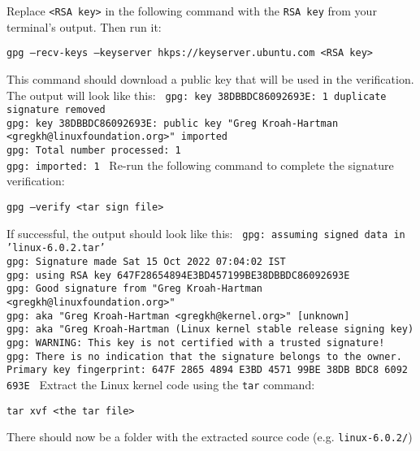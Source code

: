 \documentclass[12pt,a4paper]{report}
\begin{document}
\newline
\newline
Replace \texttt{<RSA key>} in the following command with the \texttt{RSA key} from your terminal's output. Then run it:
\newline
\newline
\centerline{\texttt{\small gpg --recv-keys --keyserver hkps://keyserver.ubuntu.com <RSA key>}}
\newline
\newline
This command should download a public key that will be used in the verification. The output will look like this:
\newline
\newline
\texttt{\scriptsize
gpg: key 38DBBDC86092693E: 1 duplicate signature removed
\\
gpg: key 38DBBDC86092693E: public key "Greg Kroah-Hartman <gregkh@linuxfoundation.org>" imported
\\
gpg: Total number processed: 1
\\
gpg:               imported: 1
}
\newline
\newline
Re-run the following command to complete the signature verification:
\newline
\newline
\centerline{\texttt{gpg --verify <tar sign file>}}
\newline
\newline
If successful, the output should look like this:
\newline
\newline
\texttt{\footnotesize
gpg: assuming signed data in 'linux-6.0.2.tar'
\\
gpg: Signature made Sat 15 Oct 2022 07:04:02 IST
\\
gpg:                using RSA key 647F28654894E3BD457199BE38DBBDC86092693E
\\
gpg: Good signature from "Greg Kroah-Hartman <gregkh@linuxfoundation.org>"
\\
gpg:                 aka "Greg Kroah-Hartman <gregkh@kernel.org>" [unknown]
\\
gpg:                 aka "Greg Kroah-Hartman (Linux kernel stable release signing key)
\\
gpg: WARNING: This key is not certified with a trusted signature!
\\
gpg:          There is no indication that the signature belongs to the owner.
\\
Primary key fingerprint: 647F 2865 4894 E3BD 4571  99BE 38DB BDC8 6092 693E
}
\newline
\newline
Extract the Linux kernel code using the \texttt{tar} command:
\newline
\newline
\centerline{\texttt{tar xvf <the tar file>}}
\newline
\newline
There should now be a folder with the extracted source code (e.g. \texttt{linux-6.0.2/}) 
\end{document}
